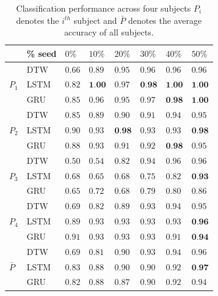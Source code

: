 \documentclass[10pt,twocolumn,letterpaper]{article}
\begin{document}
\begin{table}[h]
	\begin{center}
		\begin{tabular}{|m{1em} | m{3em} | m{1.5em} | m{1.5em} | m{1.5em} |m{1.5em} |m{1.5em} |m{1.5em} |}
			\hline
			& \% seed & $0\%$ & $10\%$ & $20\%$ & $30\%$ & $40\%$ & $50\%$\\
			\hline
			\multirow{3}{3.5em}{$P_1$}
			& DTW & $0.66$ & $0.89$ & $0.95$ & $0.96$ & $0.96$ & $0.96$\\
			\cline{2-8}
			& LSTM & $0.82$ & $\textbf{1.00}$ & $0.97$ & $\textbf{0.98}$ & $\textbf{1.00}$ & $\textbf{1.00}$\\			
			\cline{2-8}
			& GRU & $0.85$ & $0.96$ & $0.95$ & $0.97$ & $\textbf{0.98}$ & $\textbf{1.00}$\\
			\hline
			\multirow{3}{3.5em}{$P_2$}
			& DTW & $0.85$ & $0.89$ & $0.90$ & $0.91$ & $0.94$ & $0.95$\\
			\cline{2-8}
			& LSTM & $0.90$ & $0.93$ & $\textbf{0.98}$ & $0.93$ & $0.93$ & $\textbf{0.98}$\\
			\cline{2-8}
			& GRU & $0.88$ & $0.93$ & $0.91$ & $0.92$ & $\textbf{0.98}$ & $0.95$\\
			\hline
			\multirow{3}{3.5em}{$P_3$}
			& DTW & $0.50$ & $0.54$ & $0.82$ & $0.94$ & $0.96$ & $0.96$\\
			\cline{2-8}
			& LSTM & $0.68$ & $0.65$ & $0.68$ & $0.75$ & $0.82$ & $\textbf{0.93}$\\
			\cline{2-8}
			& GRU & $0.65$ & $0.72$ & $0.68$ & $0.79$ & $0.80$ & $0.86$\\
			\hline
			\multirow{3}{3.5em}{$P_4$}
			& DTW & $0.69$ & $0.82$ & $0.89$ & $0.93$ & $0.94$ & $0.95$\\
			\cline{2-8}
			& LSTM & $0.89$ & $0.93$ & $0.93$ & $0.93$ & $0.93$ & $\textbf{0.96}$\\
			\cline{2-8}
			& GRU & $0.91$ & $0.93$ & $0.93$ & $0.93$ & $0.91$ & $\textbf{0.94}$\\
			\hline
			\multirow{3}{3.5em}{$\bar{P}$}
			& DTW & $0.69$ & $0.81$ & $0.90$ & $0.93$ & $0.94$ & $0.96$\\
			\cline{2-8}
			& LSTM & $0.83$ & $0.88$ & $0.90$ & $0.90$ & $0.92$ & $\textbf{0.97}$\\
			\cline{2-8}
			& GRU & $0.82$ & $0.88$ & $0.87$ & $0.90$ & $0.92$ & $0.94$\\
			\hline
		\end{tabular}
	\end{center}
	\caption{Classification performance across four subjects  $P_i$ denotes the $i^{th}$ subject and $\bar{P}$ denotes the average accuracy of all subjects.}
	\label{table:result_table}
\end{table}
\end{document}
